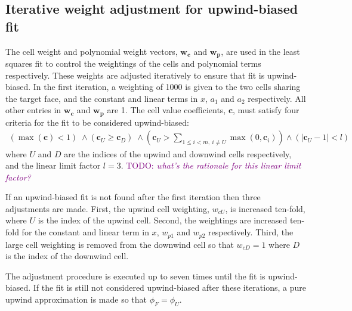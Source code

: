 \documentclass{article}
\newcommand{\TODO}[1]{\textcolor{purple}{TODO: \emph{#1}}}
\begin{document}
\subsection{Iterative weight adjustment for upwind-biased fit}
The cell weight and polynomial weight vectors, $\mathbf{w_c}$ and $\mathbf{w_p}$, are used in the least squares fit to control the weightings of the cells and polynomial terms respectively.  These weights are adjusted iteratively to ensure that fit is upwind-biased.
In the first iteration, a weighting of 1000 is given to the two cells sharing the target face, and the constant and linear terms in $x$, $a_1$ and $a_2$ respectively.  All other entries in $\mathbf{w_c}$ and $\mathbf{w_p}$ are 1.
The cell value coefficients, $\mathbf{c}$, must satisfy four criteria for the fit to be considered upwind-biased:
\begin{align}
	\left(\max(\mathbf{c}) < 1\right) \;\land 
	\left(\mathbf{c}_U \geq \mathbf{c}_D\right) \;\land 
	\left(\mathbf{c}_U > \sum_{1 \leq i < m, \:i \neq U} \max(0, \mathbf{c}_i)\right) \land
	\left(|\mathbf{c}_U - 1| < l\right)
\end{align}
where $U$ and $D$ are the indices of the upwind and downwind cells respectively, and the linear limit factor $l = 3$.  \TODO{what's the rationale for this linear limit factor?}

If an upwind-biased fit is not found after the first iteration then three adjustments are made.  First, the upwind cell weighting, $w_{cU}$, is increased ten-fold, where $U$ is the index of the upwind cell.  Second, the weightings are increased ten-fold for the constant and linear term in $x$, $w_{p1}$ and $w_{p2}$ respectively.  Third, the large cell weighting is removed from the downwind cell so that $w_{cD} = 1$ where $D$ is the index of the downwind cell.

The adjustment procedure is executed up to seven times until the fit is upwind-biased.  If the fit is still not considered upwind-biased after these iterations, a pure upwind approximation is made so that $\phi_F = \phi_U$.
\end{document}
